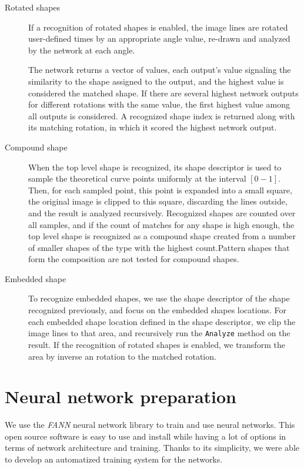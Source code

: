 \begin{description}
\item [Rotated shapes] If a recognition of rotated shapes is enabled, the image lines are rotated user-defined times by an appropriate angle value, re-drawn and analyzed by the network at each angle. 

The network returns a vector of values, each output's value signaling the similarity to the shape assigned to the output, and the highest value is considered the matched shape. If there are several highest network outputs for different rotations with the same value, the first highest value among all outputs is considered. A recognized shape index is returned along with its matching rotation, in which it scored the highest network output.

\item[Compound shape]
When the top level shape is recognized, its shape descriptor is used to sample the theoretical curve points uniformly at the interval $[0-1]$. Then, for each sampled point, this point is expanded into a small square, the original image is clipped to this square, discarding the lines outside, and the result is analyzed recursively. Recognized shapes are counted over all samples, and if the count of matches for any shape is high enough, the top level shape is recognized as a compound shape created from a number of smaller shapes of the type with the highest count.Pattern shapes that form the composition are not tested for compound shapes.

\item [Embedded shape]
To recognize embedded shapes, we use the shape descriptor of the shape recognized previously, and focus on the embedded shapes locations. For each embedded shape location defined in the shape descriptor, we clip the image lines to that area, and recursively run the \texttt{Analyze} method on the result. If the recognition of rotated shapes is enabled, we transform the area by inverse an rotation to the matched rotation.

\end{description}

\section{Neural network preparation}
We use the \emph{FANN} neural network library to train and use neural networks. This open source software is easy to use and install while having a lot of options in terms of network architecture and training. Thanks to its simplicity, we were able to develop an automatized training system for the networks.

